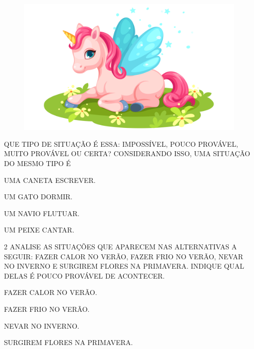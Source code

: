 \begin{figure}[H]
\includegraphics[width=\textwidth]{./media/image115.png}
\end{figure}

QUE TIPO DE SITUAÇÃO É ESSA: IMPOSSÍVEL, POUCO 
PROVÁVEL, MUITO PROVÁVEL OU CERTA? 
CONSIDERANDO ISSO, UMA SITUAÇÃO DO MESMO TIPO
É

\begin{escolha}
\item UMA CANETA ESCREVER.

\item UM GATO DORMIR.

\item UM NAVIO FLUTUAR.

\item UM PEIXE CANTAR.
\end{escolha}

\num{2} ANALISE AS SITUAÇÕES QUE APARECEM NAS ALTERNATIVAS A SEGUIR: FAZER CALOR NO VERÃO, FAZER FRIO NO VERÃO, NEVAR NO INVERNO E SURGIREM FLORES NA PRIMAVERA. INDIQUE QUAL DELAS É POUCO PROVÁVEL DE ACONTECER.

\begin{escolha}
\item FAZER CALOR NO VERÃO.

\item FAZER FRIO NO VERÃO.

\item NEVAR NO INVERNO.

\item SURGIREM FLORES NA PRIMAVERA.
\end{escolha}


